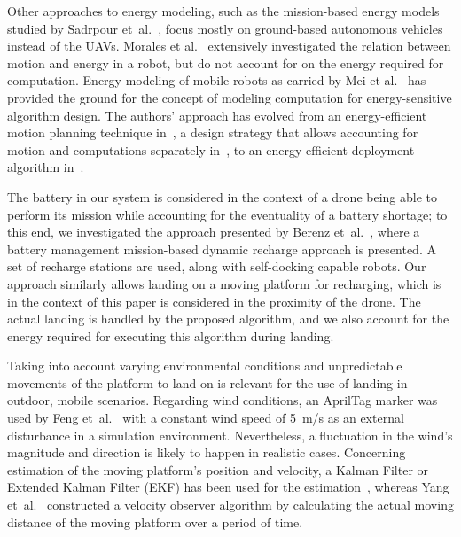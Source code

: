 \documentclass[conference]{IEEEtran}
\begin{document}
Other approaches to energy modeling, such as the mission-based energy
models studied by Sadrpour et~al.~\cite{sadrpour2013experimental,
  sadrpour2013mission}, focus mostly on ground-based autonomous
vehicles instead of the UAVs. Morales et al.~\cite{morales2009power}
extensively investigated the relation between motion and energy in a
robot, but do not account for on the energy required for computation.
%
Energy modeling of mobile robots as carried by Mei et
al.~\cite{mei2006deployment, mei2005case, mei2004energy} has provided
the ground for the concept of modeling computation for
energy-sensitive algorithm design. The authors' approach has evolved
from an energy-efficient motion planning technique
in~\cite{mei2004energy}, a design strategy that allows accounting for
motion and computations separately in~\cite{mei2005case}, to an
energy-efficient deployment algorithm in~\cite{mei2006deployment}.

The battery in our system is considered in the context of a drone
being able to perform its mission while accounting for the eventuality
of a battery shortage; to this end, we investigated the approach
presented by Berenz et~al.~\cite{berenz2012autonomous}, where a
battery management mission-based dynamic recharge approach is
presented. A set of recharge stations are used, along with
self-docking capable robots. Our approach similarly allows landing on
a moving platform for recharging, which is in the context of this
paper is considered in the proximity of the drone. The actual landing
is handled by the proposed algorithm, and we also account for the
energy required for executing this algorithm during landing.
%

Taking into account varying environmental conditions and unpredictable
movements of the platform to land on is relevant for the use of
landing in outdoor, mobile scenarios.  Regarding wind conditions, an
AprilTag marker was used by Feng et~al.~\cite{feng2018autonomous} with
a constant wind speed of 5~m/s as an external disturbance in a
simulation environment. Nevertheless, a fluctuation in the wind's
magnitude and direction is likely to happen in realistic cases.
Concerning estimation of the moving platform's position and velocity,
a Kalman Filter or Extended Kalman Filter (EKF) has been used for the
estimation~\cite{araar2017vision,feng2018autonomous,
  falanga2017vision}, whereas Yang et~al.~\cite{yang2018hybrid}
constructed a velocity observer algorithm by calculating the actual
moving distance of the moving platform over a period of time.
\end{document}
